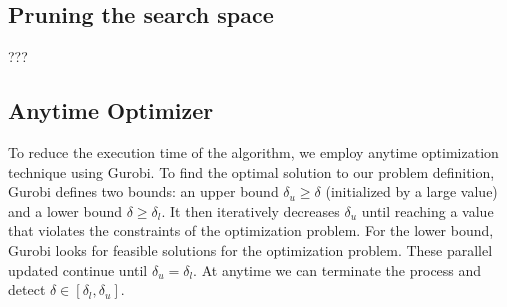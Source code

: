 \subsection{Pruning the search space}\label{PRUNESUBSECTION}
???

\subsection{Anytime Optimizer}
To reduce the execution time of the algorithm, we employ anytime optimization technique using Gurobi. To find the optimal solution to our problem definition, Gurobi defines two bounds: an upper bound $\delta_u\geq\delta$ (initialized by a large value) and a lower bound $\delta\geq\delta_l$. It then iteratively decreases $\delta_u$ until reaching a value that violates the constraints of the optimization problem. For the lower bound, Gurobi looks for feasible solutions for the optimization problem. These parallel updated continue until $\delta_u=\delta_l$. At anytime we can terminate the process and detect $\delta\in[\delta_l,\delta_u]$. 